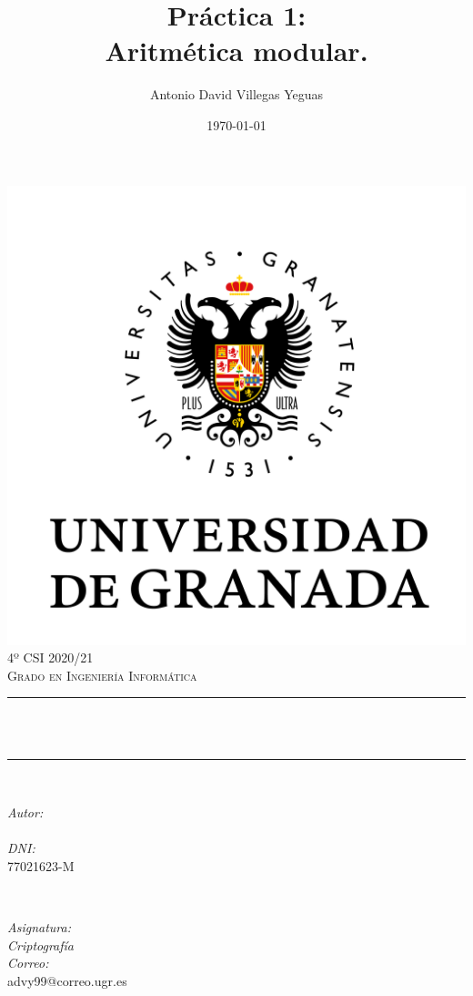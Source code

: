 \documentclass[12pt, spanish]{article}
\title{Práctica 1:\\
Aritmética modular.\hspace{0.05cm} }
\author{Antonio David Villegas Yeguas}
\date{\today}
\makeatletter
\let\thetitle\@title
\let\theauthor\@author
\makeatother
\begin{document}

\begin{titlepage}
    \centering
    \vspace*{0.3 cm}
    \includegraphics[scale = 0.50]{ugr.png}\\[0.7 cm]
    \textsc{\large 4º CSI 2020/21}\\[0.5 cm]
    \textsc{\large Grado en Ingeniería Informática}\\[0.5 cm]
    \rule{\linewidth}{0.2 mm} \\[0.2 cm]
    { \huge \bfseries \thetitle}\\
    \rule{\linewidth}{0.2 mm} \\[1 cm]

    \begin{minipage}{0.4\textwidth}
        \begin{flushleft} \large
            \emph{Autor:}\\
            \theauthor\\
			 \emph{DNI:}\\
            77021623-M
            \end{flushleft}
            \end{minipage}~
            \begin{minipage}{0.4\textwidth}
            \begin{flushright} \large
            \emph{Asignatura: \\
            Criptografía}   \\
            \emph{Correo:}\\
            advy99@correo.ugr.es
        \end{flushright}
    \end{minipage}\\[0.5cm]


\end{titlepage}
\end{document}
